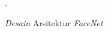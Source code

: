 \begin{figure}[H]
	\centering
	\caption{\textit{Desain} Arsitektur \textit{FaceNet}}.
	\label{alur-penelitian} %
\end{figure}

